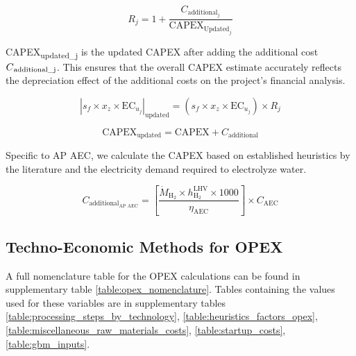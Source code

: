 \documentclass{article}
\begin{document}
\begin{equation}
R_j = 1 + \frac{C_{\text{additional}_j}}{\text{CAPEX}_{\text{Updated}_j}}
\label{eq:S9}
\end{equation}

CAPEX\textsubscript{updated\_j} is the updated CAPEX after adding the additional cost \( C\textsubscript{additional\_j} \). This ensures that the overall CAPEX estimate accurately reflects the depreciation effect of the additional costs on the project's financial analysis.

\begin{equation}
\left| s_f \times x_z \times \text{EC}_{u_j} \right|_{\text{updated}} = \left( s_f \times x_z \times \text{EC}_{u_j} \right) \times R_j
\label{eq:S10}
\end{equation}

\begin{equation}
\text{CAPEX}_{\text{updated}} = \text{CAPEX} + C_{\text{additional}}
\label{eq:S11}
\end{equation}

Specific to AP AEC, we calculate the CAPEX based on established heuristics by the literature and the electricity demand required to electrolyze water.

\begin{equation}
C_{\text{additional}_{\text{AP AEC}}} = \left[ \frac{\dot{M}_{\text{H}_2} \times h_{\text{H}_2}^{\text{LHV}} \times 1000}{\eta_{\text{AEC}}} \right] \times C_{\text{AEC}}
\label{eq:S12}
\end{equation}


\subsection{Techno-Economic Methods for OPEX}

A full nomenclature table for the OPEX calculations can be found in supplementary table \ref{table:opex_nomenclature}. Tables containing the values used for these variables are in supplementary tables \ref{table:processing_steps_by_technology}, \ref{table:heuristics_factors_opex}, \ref{table:miscellaneous_raw_materials_costs}, \ref{table:startup_costs}, \ref{table:gbm_inputs}.
\end{document}
